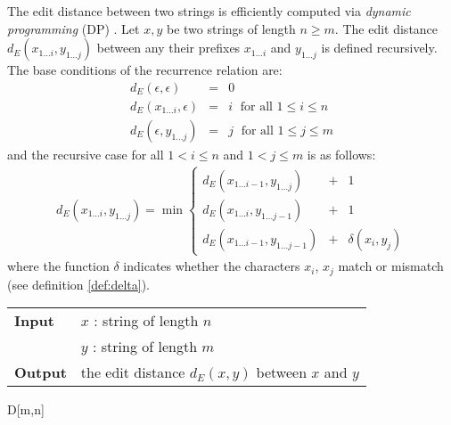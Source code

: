 The edit distance between two strings is efficiently computed via \emph{dynamic programming} (DP) \citep{Needleman1970}.
Let $x,y$ be two strings of length $n \geq m$.
The edit distance $d_E(x_{1 \dots i},y_{1 \dots j})$ between any their prefixes $x_{1 \dots i}$ and $y_{1 \dots j}$ is defined recursively.
The base conditions of the recurrence relation are:
\begin{eqnarray}
d_E(\epsilon,\epsilon)&=&0\label{eq:dp-ee}\\
d_E(x_{1 \dots i},\epsilon)&=&i \; \text{ for all } 1 \leq i \leq n\label{eq:dp-row}\\
d_E(\epsilon, y_{1 \dots j})&=&j \; \text{ for all } 1 \leq j \leq m\label{eq:dp-col}
\end{eqnarray}
and the recursive case for all $1 < i \leq n$ and $1 < j \leq m$ is as follows:
\begin{eqnarray}
d_E(x_{1\dots i},y_{1 \dots j}) = \min \left\{
\begin{array}{lcl}
d_E(x_{1 \dots i-1},y_{1 \dots j})&+&1\\
d_E(x_{1 \dots i},y_{1 \dots j-1})&+&1\\
d_E(x_{1 \dots i-1},y_{1 \dots j-1})&+&\delta(x_i, y_j)
\end{array}
\right.\label{eq:dp-min}
\end{eqnarray}
where the function $\delta$ indicates whether the characters $x_i$, $x_j$ match or mismatch (see definition \ref{def:delta}).

\begin{figure*}[t]
\begin{center}
\begin{minipage}[t]{.9\textwidth}
\begin{algorithm}[H]
\begin{tabular}{ll}
\textbf{Input}  & $x$ : string of length $n$\\
				& $y$ : string of length $m$\\
\textbf{Output} & the edit distance $d_E(x,y)$ between $x$ and $y$\\
\end{tabular}
\begin{algorithmic}[1]
\EndFor
{}
	\EndFor
\EndFor
\State \Return D[m,n]
\end{algorithmic}
\label{alg:dp-edit}
\end{algorithm}
\end{minipage}
\end{center}
\end{figure*}

